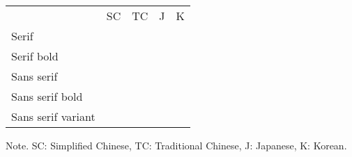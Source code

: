 \documentclass{jsarticle}
\newcommand{\sampleSC}{\UTFC{76F4}\UTFC{9AA8}}
\newcommand{\sampleTC}{\UTFT{76F4}\UTFT{9AA8}}
\newcommand{\sampleJ}{\UTF{76F4}\UTF{9AA8}}
\newcommand{\sampleK}{\UTFK{76F4}\UTFK{9AA8}}
\begin{document}
\noindent
\begin{center}
 \begin{tabular}{lllll}
  & SC & TC & J & K\\
  Serif              
  & {\sampleSC}                   
  & {\sampleTC}                   
  & {\sampleJ}                   
  & {\sampleK}                  \\
  Serif bold         
  & {\bfseries\sampleSC}          
  & {\bfseries\sampleTC}          
  & {\bfseries\sampleJ}          
  & {\bfseries\sampleK}         \\
  Sans serif         
  & {\gtfamily\sampleSC}          
  & {\gtfamily\sampleTC}          
  & {\gtfamily\sampleJ}          
  & {\gtfamily\sampleK}         \\
  Sans serif bold    
  & {\gtfamily\bfseries\sampleSC} 
  & {\gtfamily\bfseries\sampleTC} 
  & {\gtfamily\bfseries\sampleJ} 
  & {\gtfamily\bfseries\sampleK}\\
  Sans serif variant 
  & {\mgfamily\sampleSC}          
  & {\mgfamily\sampleTC}          
  & {\mgfamily\sampleJ}          
  & {\mgfamily\sampleK}         
 \end{tabular}
\end{center}

Note. SC: Simplified Chinese, TC: Traditional Chinese, J: Japanese, K: Korean.
\end{document}
